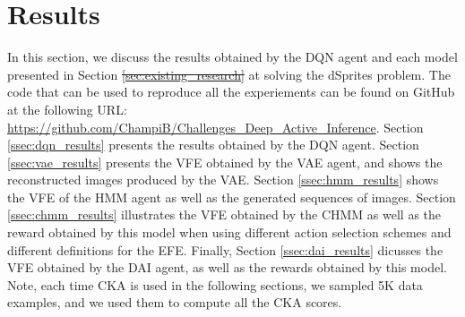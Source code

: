 \documentclass[twoside,11pt]{article}
\providecommand{\DIFadd}[1]{{\protect\color{blue}\uwave{#1}}} %
\providecommand{\DIFdel}[1]{{\protect\color{red}\sout{#1}}}                      %
\providecommand{\DIFaddbegin}{} %
\providecommand{\DIFaddend}{} %
\providecommand{\DIFdelbegin}{} %
\providecommand{\DIFdelend}{} %
\begin{document}
\section{Results} \label{sec:results}

In this section, we discuss the results obtained by the DQN agent and each model presented in Section \DIFdelbegin \DIFdel{\ref{sec:existing_research} }\DIFdelend \DIFaddbegin \DIFadd{\ref{sec:build_dai} }\DIFaddend at solving the dSprites problem. The code that can be used to reproduce all the experiements can be found on GitHub at the following URL: \url{https://github.com/ChampiB/Challenges_Deep_Active_Inference}. Section \ref{ssec:dqn_results} presents the results obtained by the DQN agent. Section \ref{ssec:vae_results} presents the VFE obtained by the VAE agent, and shows the reconstructed images produced by the VAE. Section \ref{ssec:hmm_results} shows the VFE of the HMM agent as well as the generated sequences of images. Section \ref{ssec:chmm_results} illustrates the VFE obtained by the CHMM as well as the reward obtained by this model when using different action selection schemes and different definitions for the EFE. Finally, Section \ref{ssec:dai_results} dicusses the VFE obtained by the DAI agent, as well as the rewards obtained by this model. Note, each time CKA is used in the following sections, we sampled 5K data examples, and we used them to compute all the CKA scores. 
\end{document}

